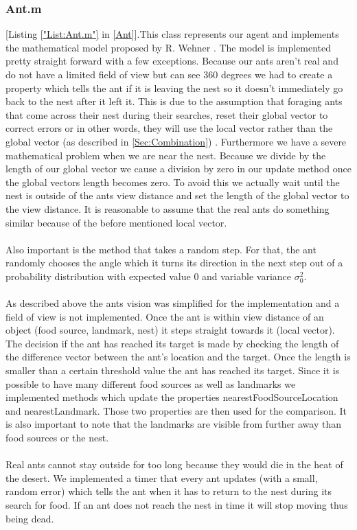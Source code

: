 \documentclass[11pt]{article}
\begin{document}
\subsubsection{Ant.m}
[Listing \ref{"List:Ant.m"} in \ref{Ant}].This class represents our agent and implements the mathematical model proposed by R. Wehner \cite{Wehner1988}. The model is implemented pretty straight forward with a few exceptions. Because
our ants aren't real and do not have a limited field of view but can see 360 degrees we had to create
a property which tells the ant if it is leaving the nest so it doesn't immediately go back to the nest
after it left it. This is due to the assumption that foraging ants that come across their nest during
their searches, reset their global vector to correct errors or in other words, they will use the local
vector rather than the global vector (as described in  \ref{Sec:Combination}) . Furthermore we have a severe mathematical problem
when we are near the nest. Because we divide by the length of our global vector we cause a division
by zero in our update method once the global vectors length becomes zero. To avoid this we
actually wait until the nest is outside of the ants view distance and set the length of the global vector
to the view distance. It is reasonable to assume that the real ants do something similar because of
the before mentioned local vector.\\
\ \\
Also important is the method that takes a random step. For that, the ant randomly chooses the angle which it turns its direction in the next step out of a probability distribution with expected value $0$ and variable variance $\sigma_{0}^{2}$. \\
\ \\
As described above the ants vision was simplified for the implementation and a field of view is not
implemented. Once the ant is within view distance of an object (food source, landmark, nest) it
steps straight towards it (local vector). The decision if the ant has reached its target is made by
checking the length of the difference vector between the ant's location and the target. Once the
length is smaller than a certain threshold value the ant has reached its target. Since it is possible to
have many different food sources as well as landmarks we implemented methods which update the
properties nearestFoodSourceLocation and nearestLandmark. Those two properties are then used
for the comparison. It is also important to note that the landmarks are visible from further away than
food sources or the nest.\\
\ \\
Real ants cannot stay outside for too long because they would die in the heat of the desert. We
implemented a timer that every ant updates (with a small, random error) which tells the ant when it
has to return to the nest during its search for food. If an ant does not reach the nest in time it will
stop moving thus being dead.
\end{document}
